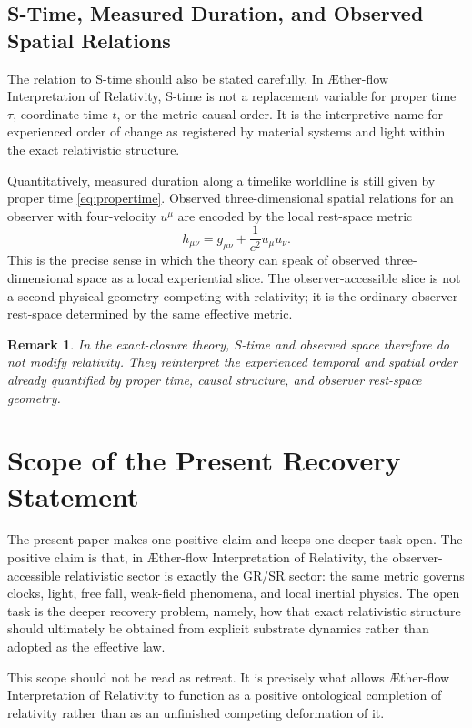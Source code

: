 \documentclass[11pt]{article}
\newcommand{\Aflow}{\AE{}ther-flow}
\newcommand{\TheoryName}{\Aflow{} Interpretation of Relativity}
\newtheorem{remark}{Remark}
\begin{document}
\subsection{S-Time, Measured Duration, and Observed Spatial Relations}

The relation to S-time should also be stated carefully. In \TheoryName{}, S-time is not a replacement variable for proper time \(\tau\), coordinate time \(t\), or the metric causal order. It is the interpretive name for experienced order of change as registered by material systems and light within the exact relativistic structure.

Quantitatively, measured duration along a timelike worldline is still given by proper time \eqref{eq:propertime}. Observed three-dimensional spatial relations for an observer with four-velocity \(u^\mu\) are encoded by the local rest-space metric
\begin{equation}
h_{\mu\nu}
=
g_{\mu\nu}
+
\frac{1}{c^2}u_\mu u_\nu.
\label{eq:spatialprojector}
\end{equation}
This is the precise sense in which the theory can speak of observed three-dimensional space as a local experiential slice. The observer-accessible slice is not a second physical geometry competing with relativity; it is the ordinary observer rest-space determined by the same effective metric.

\begin{remark}
In the exact-closure theory, S-time and observed space therefore do not modify relativity. They reinterpret the experienced temporal and spatial order already quantified by proper time, causal structure, and observer rest-space geometry.
\end{remark}

\section{Scope of the Present Recovery Statement}

The present paper makes one positive claim and keeps one deeper task open. The positive claim is that, in \TheoryName{}, the observer-accessible relativistic sector is exactly the GR/SR sector: the same metric governs clocks, light, free fall, weak-field phenomena, and local inertial physics. The open task is the deeper recovery problem, namely, how that exact relativistic structure should ultimately be obtained from explicit substrate dynamics rather than adopted as the effective law.

This scope should not be read as retreat. It is precisely what allows \TheoryName{} to function as a positive ontological completion of relativity rather than as an unfinished competing deformation of it.
\end{document}
